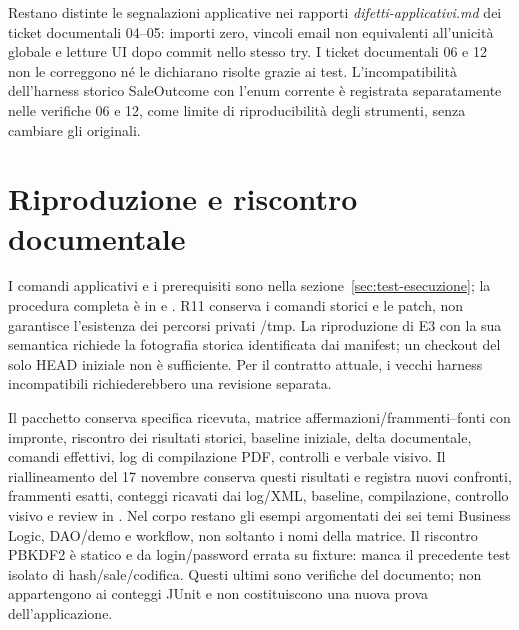 Restano distinte le segnalazioni applicative nei rapporti
\emph{difetti-applicativi.md} dei ticket documentali 04--05: importi zero, vincoli email non
equivalenti all'unicità globale e letture UI dopo commit nello stesso try.
I ticket documentali 06 e 12 non le correggono né le dichiarano risolte grazie ai test.
L'incompatibilità dell'harness storico SaleOutcome con l'enum corrente è
registrata separatamente nelle verifiche 06 e 12, come limite di
riproducibilità degli strumenti, senza cambiare gli originali.

\section{Riproduzione e riscontro documentale}
I comandi applicativi e i prerequisiti sono nella
sezione~\ref{sec:test-esecuzione}; la procedura completa è in
 e . R11 conserva i
comandi storici e le patch, non garantisce l'esistenza dei percorsi
privati /tmp. La riproduzione di E3 con la sua semantica richiede la
fotografia storica identificata dai manifest; un checkout del solo HEAD
iniziale non è sufficiente. Per il contratto attuale, i vecchi harness
incompatibili richiederebbero una revisione separata.

Il pacchetto  conserva
specifica ricevuta, matrice affermazioni/frammenti--fonti con impronte,
riscontro dei risultati storici, baseline iniziale, delta documentale,
comandi effettivi, log di compilazione PDF, controlli e verbale visivo.
Il riallineamento del 17 novembre conserva questi risultati e registra
nuovi confronti, frammenti esatti, conteggi ricavati dai log/XML, baseline,
compilazione, controllo visivo e review in
. Nel corpo restano gli esempi
argomentati dei sei temi Business Logic, DAO/demo e workflow, non soltanto
i nomi della matrice. Il riscontro PBKDF2 è statico e da login/password errata
su fixture: manca il precedente test isolato di hash/sale/codifica.
Questi ultimi sono verifiche del documento; non appartengono ai conteggi
JUnit e non costituiscono una nuova prova dell'applicazione.
\endgroup

